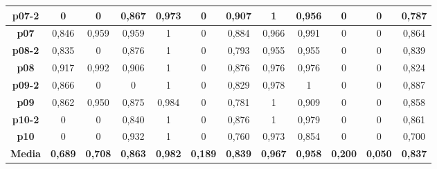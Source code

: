 \documentclass{article}
\begin{document}
\begin{landscape}
\begin{table}[]
\begin{tabular}{|c|c|c|c|c|c|c|c|c|c|c|c|}
    \textbf{p07-2}  &  0      &  0      &  0,867  &  0,973  &  0      &  0,907  &  1      &  0,956  &  0      &  0      &  0,787 \\ \hline
    \textbf{p07}    &  0,846  &  0,959  &  0,959  &  1      &  0      &  0,884  &  0,966  &  0,991  &  0      &  0      &  0,864 \\ \hline
    \textbf{p08-2}  &  0,835  &  0      &  0,876  &  1      &  0      &  0,793  &  0,955  &  0,955  &  0      &  0      &  0,839 \\ \hline
    \textbf{p08}    &  0,917  &  0,992  &  0,906  &  1      &  0      &  0,876  &  0,976  &  0,976  &  0      &  0      &  0,824 \\ \hline
    \textbf{p09-2}  &  0,866  &  0      &  0      &  1      &  0      &  0,829  &  0,978  &  1      &  0      &  0      &  0,887 \\ \hline
    \textbf{p09}    &  0,862  &  0,950  &  0,875  &  0,984  &  0      &  0,781  &  1      &  0,909  &  0      &  0      &  0,858 \\ \hline
    \textbf{p10-2}  &  0      &  0      &  0,840  &  1      &  0      &  0,876  &  1      &  0,979  &  0      &  0      &  0,861 \\ \hline
    \textbf{p10}    &  0      &  0      &  0,932  &  1      &  0      &  0,760  &  0,973  &  0,854  &  0      &  0      &  0,700 \\ \hline
    \textbf{Media}  &  \textbf{0,689}  &  \textbf{0,708}  &  \textbf{0,863}  &  \textbf{0,982}  &  \textbf{0,189}  &  \textbf{0,839}  &  \textbf{0,967}  &  \textbf{0,958}  &  \textbf{0,200}  &  \textbf{0,050}  &  \textbf{0,837} \\ \hline
    \end{tabular}
    \end{table}
    \end{landscape}
    
\end{document}
